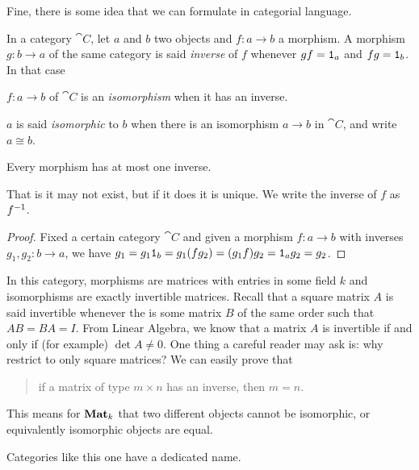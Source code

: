 Fine, there is some idea that we can formulate in categorial language.

\begin{definition}
  In a category \(\cat C\), let \(a\) and \(b\) two objects and
  \(f : a \to b\) a morphism. A morphism \(g : b \to a\) of the same
  category is said {\em inverse} of \(f\) whenever \(gf = \mathtt 1_a\) and
  \(fg = \mathtt 1_b\). In that case
  \begin{tcbitem}
  \item \(f : a \to b\) of \(\cat C\) is an {\em isomorphism} when it
    has an inverse.
  \item \(a\) is said {\em isomorphic} to \(b\) when there is an
    isomorphism \(a \to b\) in \(\cat C\), and write \(a \cong b\).
  \end{tcbitem}
\end{definition}

\begin{lemma}
  Every morphism has at most one inverse.
\end{lemma}

That is it may not exist, but if it does it is unique. We write the
inverse of \(f\) as \(f^{-1}\).

\begin{proof}
  Fixed a certain category \(\cat C\) and given a morphism
  \(f : a \to b\) with inverses \(g_1, g_2 : b \to a\), we have
  \(g_1 = g_1 \mathtt 1_b = g_1 (fg_2) = (g_1f)g_2 = \mathtt 1_a g_2 = g_2\).
\end{proof}

\begin{example}
  In this category, morphisms are matrices with entries in some field
  \(k\) and isomorphisms are exactly invertible matrices. Recall that
  a square matrix \(A\) is said invertible whenever the is some matrix
  \(B\) of the same order such that \(AB = BA = I\). From Linear
  Algebra, we know that a matrix \(A\) is invertible if and only if
  (for example) \(\det A \ne 0\). One thing a careful reader may ask is:
  why restrict to only square matrices? We can easily prove that
  \begin{quotation}
    if a matrix of type \(m \times n\) has an inverse, then \(m=n\).
  \end{quotation}
  This means for \(\mathbf{Mat}_k\) that two different objects cannot be
  isomorphic, or equivalently isomorphic objects are equal.
\end{example}

Categories like this one have a dedicated name.

